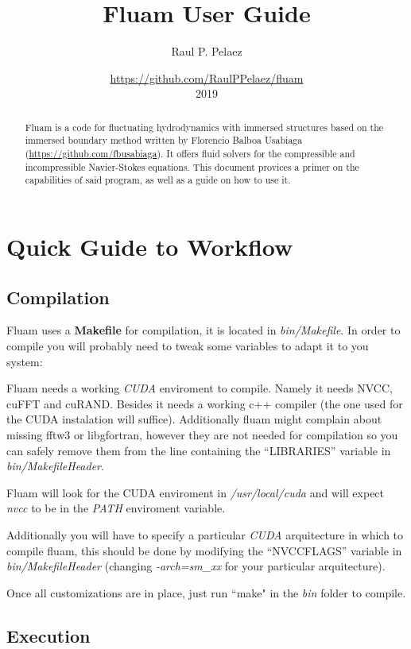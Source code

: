 \documentclass[a4paper,11pt]{refart}
\title{Fluam User Guide}
\author{Raul P. Pelaez}
\date{\url{https://github.com/RaulPPelaez/fluam}\\2019}
\begin{document}
\maketitle

\begin{abstract}
Fluam is a code for fluctuating hydrodynamics with immersed structures based on the immersed boundary method written by Florencio Balboa Usabiaga (\url{https://github.com/fbusabiaga}). It offers fluid solvers for the compressible and incompressible Navier-Stokes equations. This document provices a primer on the capabilities of said program, as well as a guide on how to use it.
\end{abstract}

\tableofcontents
\clearpage

\section{Quick Guide to Workflow} \label{quickguide}
\subsection{Compilation}
Fluam uses a \textbf{Makefile} for compilation, it is located in \emph{bin/Makefile}. In order to compile you will probably need to tweak some variables to adapt it to you system:

Fluam needs a working \emph{CUDA} enviroment to compile. Namely it needs NVCC, cuFFT and cuRAND. Besides it needs a working c++ compiler (the one used for the CUDA instalation will suffice). Additionally fluam might complain about missing fftw3 or libgfortran, however they are not needed for compilation so you can safely remove them from the line containing the ``LIBRARIES'' variable in \emph{bin/MakefileHeader}.

Fluam will look for the CUDA enviroment in \emph{/usr/local/cuda} and will expect \emph{nvcc} to be in the \emph{PATH} enviroment variable.

Additionally you will have to specify a particular \emph{CUDA} arquitecture in which to compile fluam, this should be done by modifying the ``NVCCFLAGS'' variable in \emph{bin/MakefileHeader} (changing \emph{-arch=sm\_xx} for your particular arquitecture).


Once all customizations are in place, just run ``make" in the \emph{bin} folder to compile.

\subsection{Execution}
\end{document}

